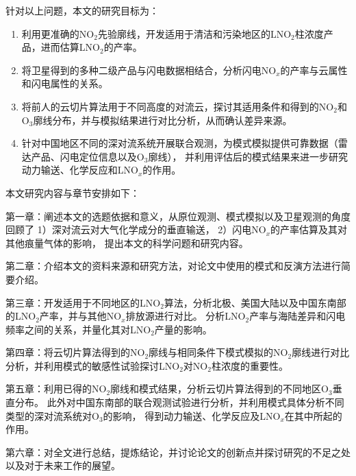 针对以上问题，本文的研究目标为：

\begin{enumerate}[label=（\arabic*）, labelindent=\parindent, leftmargin=0pt, widest=0, itemindent=*, topsep=0pt, partopsep=0pt, parsep=0pt]

\item 利用更准确的NO$_2$先验廓线，开发适用于清洁和污染地区的LNO$_2$柱浓度产品，进而估算LNO$_2$的产率。

\item 将卫星得到的多种二级产品与闪电数据相结合，分析闪电NO$_x$的产率与云属性和闪电属性的关系。

\item 将前人的云切片算法用于不同高度的对流云，探讨其适用条件和得到的NO$_2$和O$_3$廓线分布，并与模拟结果进行对比分析，从而确认差异来源。

\item 针对中国地区不同的深对流系统开展联合观测，为模式模拟提供可靠数据（雷达产品、闪电定位信息以及O$_3$廓线），
并利用评估后的模式结果来进一步研究动力输送、化学反应和LNO$_x$的作用。

\end{enumerate}

本文研究内容与章节安排如下：

第一章：阐述本文的选题依据和意义，从原位观测、模式模拟以及卫星观测的角度回顾了
1）深对流云对大气化学成分的垂直输送，
2）闪电NO$_x$的产率估算及其对其他痕量气体的影响，
提出本文的科学问题和研究内容。

第二章：介绍本文的资料来源和研究方法，对论文中使用的模式和反演方法进行简要介绍。

第三章：开发适用于不同地区的LNO$_2$算法，分析北极、美国大陆以及中国东南部的LNO$_2$产率，并与其他NO$_x$排放源进行对比。
分析LNO$_2$产率与海陆差异和闪电频率之间的关系，并量化其对LNO$_2$产量的影响。

第四章：将云切片算法得到的NO$_2$廓线与相同条件下模式模拟的NO$_2$廓线进行对比分析，并利用模式的敏感性试验探讨LNO$_2$对NO$_2$柱浓度的重要性。

第五章：利用已得的NO$_2$廓线和模式结果，分析云切片算法得到的不同地区O$_3$垂直分布。
此外对中国东南部的联合观测试验进行分析，并利用模式具体分析不同类型的深对流系统对O$_3$的影响，
得到动力输送、化学反应及LNO$_x$在其中所起的作用。

第六章：对全文进行总结，提炼结论，并讨论论文的创新点并探讨研究的不足之处以及对于未来工作的展望。
